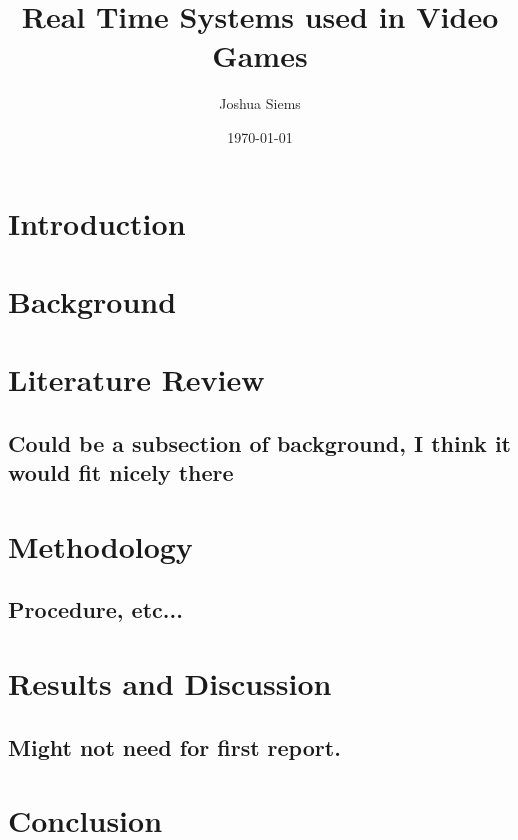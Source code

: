 \documentclass[a4paper, 12pt]{article}
\title{Real Time Systems used in Video Games}
\author{Joshua Siems}
\date{\today}
\begin{document}

\maketitle

\newpage

    \tableofcontents

\newpage


\section{Introduction}

\newpage

\section{Background}

\newpage

\section{Literature Review}
    \subsection{Could be a subsection of background, I think it would fit nicely there}

\newpage

\section{Methodology}
    \subsection{Procedure, etc...}

\newpage

\section{Results and Discussion}
    \subsection{Might not need for first report.}

\newpage

\section{Conclusion}
\end{document}
